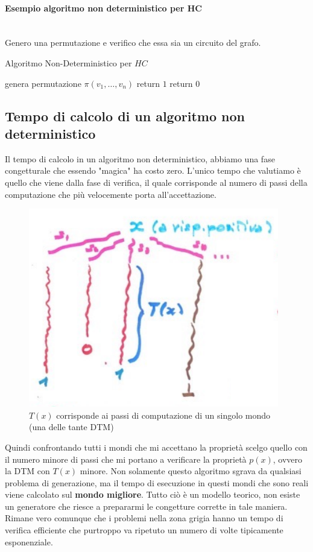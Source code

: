 \documentclass{article}
\begin{document}
\paragraph{Esempio algoritmo non deterministico per HC}\mbox{}\\
Genero una permutazione e verifico che essa sia un circuito del grafo.
\begin{algorithm}[hbt!]
    \caption{Algoritmo Non-Deterministico per $HC$}\label{alg:ntm-hc}
    genera permutazione $\pi(v_1,\dots,v_n)$\;
    {
        return $1$\;
    }
    return $0$\;
\end{algorithm}

\subsection{Tempo di calcolo di un algoritmo non deterministico}
Il tempo di calcolo in un algoritmo non deterministico, abbiamo una fase congetturale
che essendo "magica" ha costo zero. L'unico tempo che valutiamo è quello che viene
dalla fase di verifica, il quale corrisponde al numero di passi della computazione che più
velocemente porta all'accettazione.
\begin{figure}[H]
    \centering
    \includegraphics[scale=0.6]{images/tempondet.png}
    \caption{$T(x)$ corrisponde ai passi di computazione di un singolo mondo (una delle tante DTM)}
\end{figure}
Quindi confrontando tutti i mondi che mi accettano la proprietà scelgo quello con il numero
minore di passi che mi portano a verificare la proprietà $p(x)$, ovvero
la DTM con $T(x)$ minore. Non solamente questo algoritmo
sgrava da qualsiasi problema di generazione, ma il tempo di esecuzione in questi mondi
che sono reali viene calcolato sul \textbf{mondo migliore}.
\newline\newline
Tutto ciò è un modello teorico, non esiste un generatore che riesce a prepararmi le congetture
corrette in tale maniera. Rimane vero comunque che i problemi nella zona grigia hanno un tempo
di verifica efficiente che purtroppo va ripetuto un numero di volte
tipicamente esponenziale.
\end{document}
